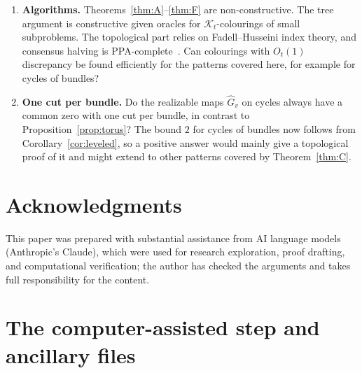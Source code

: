 \documentclass[11pt,letterpaper]{article}
\theoremstyle{definition}
\newcommand{\hG}{\widehat{G}}
\begin{document}
\begin{enumerate}[leftmargin=*,itemsep=2pt]
which is Question~12 of~\cite{HMMS25}? A computer-free proof of $\mathcal{K}_3=2$ would also be welcome.
\item \textbf{Algorithms.} Theorems~\ref{thm:A}--\ref{thm:F} are non-constructive. The tree
argument is constructive given oracles for $\mathcal{K}_t$-colourings of small subproblems. The topological
part relies on Fadell--Husseini index theory, and consensus halving is
PPA-complete~\cite{FG18,FHSZ23}. Can colourings with $O_t(1)$ discrepancy be found efficiently for
the patterns covered here, for example for cycles of bundles?
\item \textbf{One cut per bundle.} Do the realizable maps $\hG_v$ on cycles always have a common zero
with one cut per bundle, in contrast to Proposition~\ref{prop:torus}? The bound $2$ for
cycles of bundles now follows from Corollary~\ref{cor:leveled}, so a positive answer would mainly give
a topological proof of it and might extend to other patterns covered by Theorem~\ref{thm:C}.
\end{enumerate}

\section*{Acknowledgments}
This paper was prepared with substantial assistance from AI language models (Anthropic's Claude),
which were used for research exploration, proof drafting, and computational verification; the
author has checked the arguments and takes full responsibility for the content.




\appendix

\section{The computer-assisted step and ancillary files}\label{app:k3}
\end{document}
